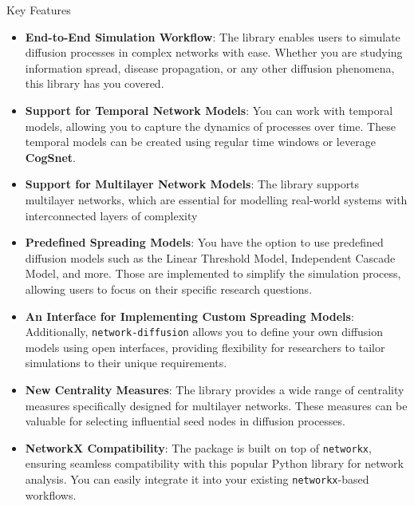 \documentclass[final]{beamer}
\newlength{\colwidth}
\begin{document}
\begin{frame}[t, fragile]
\begin{columns}[t]
\begin{column}{\colwidth}
\begin{block}{Key Features}
    \begin{itemize}
        \item \textbf{End-to-End Simulation Workflow}: The library enables users 
        to simulate diffusion processes in complex networks with ease. Whether
        you are studying information spread, disease propagation, or any other
        diffusion phenomena, this library has you covered.
        \item \textbf{Support for Temporal Network Models}: You can work with temporal models, allowing you to
        capture the dynamics of processes over time. These temporal models can be
        created using regular time windows or leverage \textbf{CogSnet}.
        \item \textbf{Support for Multilayer Network Models}: The library supports multilayer networks, which are
        essential for modelling real-world systems with interconnected layers of
        complexity
        \item \textbf{Predefined Spreading Models}: You have the option to use predefined diffusion 
        models such as the Linear Threshold Model, Independent Cascade Model, and more. Those are
        implemented to simplify the simulation process, allowing users to focus on their specific
        research questions.
        \item \textbf{An Interface for Implementing Custom Spreading Models}: Additionally, 
        \lstinline[style=py]{network-diffusion} allows you to define your own diffusion models using
        open interfaces, providing flexibility for researchers to tailor simulations to their unique
        requirements.
        \item \textbf{New Centrality Measures}: The library provides a wide range of centrality 
        measures specifically designed for multilayer networks. These measures can be valuable for
        selecting influential seed nodes in diffusion processes.
        \item \textbf{NetworkX Compatibility}: The package is built on top of  
        \lstinline[style=py]{networkx}, ensuring seamless compatibility with this popular Python 
        library for network analysis. You can easily integrate it into your existing
        \lstinline[style=py]{networkx}-based workflows.
    \end{itemize}
\end{block}

\end{column}


\end{columns}
\end{frame}
\end{document}
